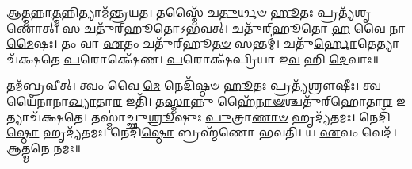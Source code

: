 𑌆\-\ul{𑌤𑍍𑌮}\-𑌨𑍍𑌨𑌾\-\ul{𑌤𑍍𑌮}\-𑌨𑍍𑌨𑌿𑌤𑍍𑌯𑌾𑌮᳴𑌨𑍍𑌤𑍍𑌰𑌯𑌤। 𑌤𑌸𑍍𑌮𑍈᳴ 𑌚\-\ul{𑌤𑍁}\-𑌰𑍍𑌥𑍞 \ul{𑌹𑍂}\-𑌤𑌃 𑌪𑍍𑌰𑌤𑍍𑌯᳴𑌶𑍃𑌣𑍋𑌤𑍍। 𑌸 𑌚𑌤𑍁᳴𑌰𑍍‌𑌹𑍂𑌤𑍋𑌽𑌭𑌵𑌤𑍍। 𑌚𑌤𑍁᳴𑌰𑍍‌𑌹𑍂𑌤𑍋 \ul{𑌹} 𑌵𑍈 𑌨𑌾\-\ul{𑌮𑍈}\-𑌷𑌃। 𑌤𑌂 𑌵𑌾 \ul{𑌏}\-𑌤𑌂 𑌚𑌤𑍁᳴𑌰𑍍‌𑌹𑍂\-\ul{𑌤}\-\-\ul{𑍞} 𑌸𑌨𑍍𑌤𑌮𑍍॑। 𑌚𑌤𑍁᳴\-\ul{𑌰𑍍𑌹𑍋}\-𑌤𑍇𑌤𑍍𑌯𑌾𑌚᳴𑌕𑍍𑌷𑌤𑍇 \ul{𑌪}\-𑌰𑍋𑌕𑍍𑌷𑍇᳴𑌣। \ul{𑌪}\-𑌰𑍋𑌕𑍍𑌷᳴𑌪𑍍𑌰𑌿𑌯𑌾 𑌇\-\ul{𑌵} 𑌹𑌿 \ul{𑌦𑍇}\-𑌵𑌾𑌃॥

𑌤𑌮᳴𑌬𑍍𑌰𑌵𑍀𑌤𑍍। 𑌤𑍍𑌵𑌂 𑌵𑍈 \ul{𑌮𑍇} 𑌨𑍇𑌦𑌿᳴𑌷𑍍𑌠𑍞 \ul{𑌹𑍂}\-𑌤𑌃 𑌪𑍍𑌰𑌤𑍍𑌯᳴𑌶𑍍𑌰𑍗𑌷𑍀𑌃। 𑌤𑍍𑌵𑌯𑍈᳴𑌨𑌾𑌨𑌾\-\ul{𑌖𑍍𑌯𑌾}\-𑌤𑌾\-\ul{𑌰} 𑌇𑌤𑌿᳴। 𑌤\-\ul{𑌸𑍍𑌮𑌾}\-𑌨𑍍𑌨𑍁 𑌹𑍈᳴\-\ul{𑌨𑌾}\-\-\ul{𑍟}\-𑌶𑍍𑌚𑌤𑍁᳴𑌰𑍍‌𑌹𑍋𑌤𑌾\-\ul{𑌰} 𑌇𑌤𑍍𑌯𑌾𑌚᳴𑌕𑍍𑌷𑌤𑍇। 𑌤𑌸𑍍𑌮𑌾॑𑌚𑍍𑌛𑍁\-\ul{𑌶𑍍𑌰𑍂}\-𑌷𑍁𑌃 \ul{𑌪𑍁}\-𑌤𑍍𑌰𑌾\-\ul{𑌣𑌾}\-\-\ul{𑍞} 𑌹𑍃𑌦𑍍𑌯᳴𑌤𑌮𑌃। 𑌨𑍇𑌦𑌿᳴\-\ul{𑌷𑍍𑌠𑍋} 𑌹𑍃𑌦𑍍𑌯᳴𑌤𑌮𑌃। 𑌨𑍇𑌦𑌿᳴\-\ul{𑌷𑍍𑌠𑍋} 𑌬𑍍𑌰𑌹𑍍𑌮᳴𑌣𑍋 𑌭𑌵𑌤𑌿। 𑌯 \ul{𑌏}\-𑌵𑌂 𑌵𑍇𑌦᳴।\\
𑌆𑌤𑍍𑌮𑌨𑍇 𑌨𑌮𑌃॥


\newcommand{\ssankalpa}[1]{\refstepcounter{ssk} 
#1𑌤\-\ul{𑌨𑍍𑌮𑍇} 𑌮𑌨𑌃᳴ \ul{𑌶𑌿}\-𑌵𑌸᳴\-\ul{𑌙𑍍𑌕}\-𑌲𑍍𑌪𑌮᳴𑌸𑍍𑌤𑍁॥\devanumber{\arabic{ssk}}॥}
\newcommand{\ssankalpaalign}[2]{
\setcounter{shlokacount}{\value{ssk}}
\twolineshloka{#1}{#2𑌤\-\ul{𑌨𑍍𑌮𑍇} 𑌮𑌨𑌃᳴ \ul{𑌶𑌿}\-𑌵𑌸᳴\-\ul{𑌙𑍍𑌕}\-𑌲𑍍𑌪𑌮᳴𑌸𑍍𑌤𑍁}
\refstepcounter{ssk}
\pagebreak[0]}


